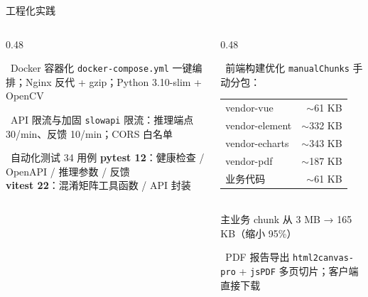 \documentclass[aspectratio=169, 11pt]{ctexbeamer}
\begin{document}
\begin{frame}{工程化实践}
\begin{columns}[T]
  \begin{column}{0.48\linewidth}
    \begin{block}{\footnotesize\faDocker\ Docker 容器化}
      \footnotesize \texttt{docker-compose.yml} 一键编排；Nginx 反代 + gzip；Python 3.10-slim + OpenCV
    \end{block}
    \begin{block}{\footnotesize\faLock\ API 限流与加固}
      \footnotesize \texttt{slowapi} 限流：推理端点 30/min、反馈 10/min；CORS 白名单
    \end{block}
    \begin{block}{\footnotesize\faVial\ 自动化测试 34 用例}
      \footnotesize \textbf{pytest 12}：健康检查 / OpenAPI / 推理参数 / 反馈 \\
      \textbf{vitest 22}：混淆矩阵工具函数 / API 封装
    \end{block}
  \end{column}
  \begin{column}{0.48\linewidth}
    \begin{block}{\footnotesize\faBolt\ 前端构建优化}
      \footnotesize \texttt{manualChunks} 手动分包：\\
      \vspace{0.2em}
      \scriptsize
      \begin{tabular}{lr}
        vendor-vue     & $\sim$61 KB \\
        vendor-element & $\sim$332 KB \\
        vendor-echarts & $\sim$343 KB \\
        vendor-pdf     & $\sim$187 KB \\
        业务代码       & $\sim$61 KB \\
      \end{tabular}
      \\[0.3em]
      主业务 chunk 从 3 MB → 165 KB（\alert{缩小 95\%}）
    \end{block}
    \begin{block}{\footnotesize\faFileExport\ PDF 报告导出}
      \footnotesize \texttt{html2canvas-pro} + \texttt{jsPDF} 多页切片；客户端直接下载
    \end{block}
  \end{column}
\end{columns}
\end{frame}
\end{document}
